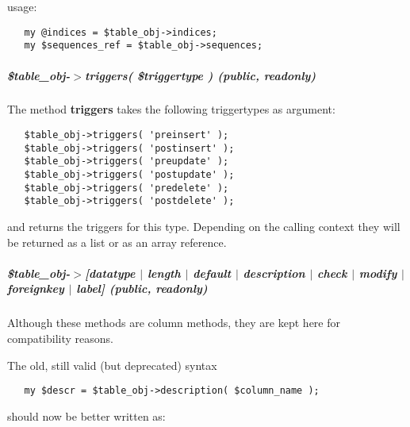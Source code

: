 usage:

\begin{verbatim}
   my @indices = $table_obj->indices;
   my $sequences_ref = $table_obj->sequences;
\end{verbatim}
\subparagraph*{\$table\_obj-$>$triggers( \$triggertype ) (public, readonly)\label{Apiis::Model::TableObj_--_internal_package_to_provide_a_table_object_with_methods_to_access_a_single_table_and_its_columns__table_obj-_triggers_triggertype_public_readonly_}}


The method \textbf{triggers} takes the following triggertypes as argument:

\begin{verbatim}
   $table_obj->triggers( 'preinsert' );
   $table_obj->triggers( 'postinsert' );
   $table_obj->triggers( 'preupdate' );
   $table_obj->triggers( 'postupdate' );
   $table_obj->triggers( 'predelete' );
   $table_obj->triggers( 'postdelete' );
\end{verbatim}


and returns the triggers for this type. Depending on the calling context
they will be returned as a list or as an array reference.

\subparagraph*{\$table\_obj-$>$[datatype $|$ length $|$ default $|$ description $|$ check $|$ modify $|$ foreignkey $|$ label] (public, readonly)\label{Apiis::Model::TableObj_--_internal_package_to_provide_a_table_object_with_methods_to_access_a_single_table_and_its_columns__table_obj-_datatype_length_default_description_check_modify_foreignkey_label_public_readonly_}}


Although these methods are column methods, they are kept here for
compatibility reasons.



The old, still valid (but deprecated) syntax

\begin{verbatim}
   my $descr = $table_obj->description( $column_name );
\end{verbatim}


should now be better written as:

